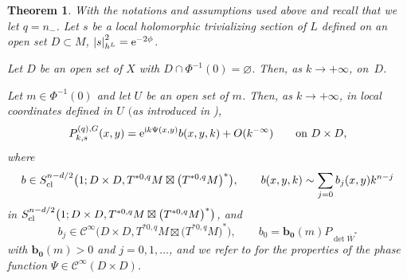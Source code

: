 \documentclass[10pt,a4paper]{amsart}
\numberwithin{equation}{section}
\newtheorem{Theorem}{Theorem}[section]
\newcommand{\abs}[1]{\left\vert#1\right\vert}
\begin{document}
 	\begin{Theorem}\label{t-gue220914yyd}
 		With the notations and assumptions used above and recall that we let $q=n_-$. Let $s$ be a local holomorphic trivializing section of $L$ defined on an open set $D\subset M$, $\abs{s}^2_{h^L}={\rm e}^{-2\phi}$.
 		
 		Let $D$ be an open set of $X$ with $D\cap \Phi^{-1}(0) =\varnothing$. Then, as $k\rightarrow +\infty$,  on~$D$.
 		
 		Let $m \in \Phi^{-1}(0)$ and let $U$ be an open set of $m$. Then, as $k\rightarrow +\infty$, in local coordinates defined in $U$ $($as introduced in {\rm\cite{hsiaohuang})},
 		\[%
 			P^{(q),G}_{k,s}(x,y)={\rm e}^{{\rm i}k\Psi(x,y)}b(x,y,k)+O(k^{-\infty})\qquad\text{on} \ D\times D,
 		\]
 		where \[b\in S^{n-d/2}_{{\rm cl }}\bigl(1;D\times D,T^{*0,q}M\boxtimes\bigl(T^{*0,q}M\bigr)^*\bigr) ,\qquad b(x,y,k)\sim\sum_{j=0}b_j(x,y)k^{n-j}\] in $S^{n-d/2}_{{\rm cl }}\bigl(1;D\times D,T^{*0,q}M\boxtimes\bigl(T^{*0,q}M\bigr)^*\bigr) $,
 		and \[b_j\in\mathcal{C}^\infty\bigl(D\times D,T^{*0,q}M\boxtimes\bigl(T^{*0,q}M\bigr)^*\bigr) ,\qquad b_0=\mathbf{b_0}(m) P_{\det \overline{W}^*}\]
 with $\mathbf{b_0}(m)> 0$ and $j=0,1,\dots$,
 		and we refer to {\rm\cite[\emph{Theorem} 1.8]{hsiaohuang}} for the properties of the phase function $\Psi\in\mathcal{C}^\infty(D\times D)$.
 	\end{Theorem}
\end{document}
